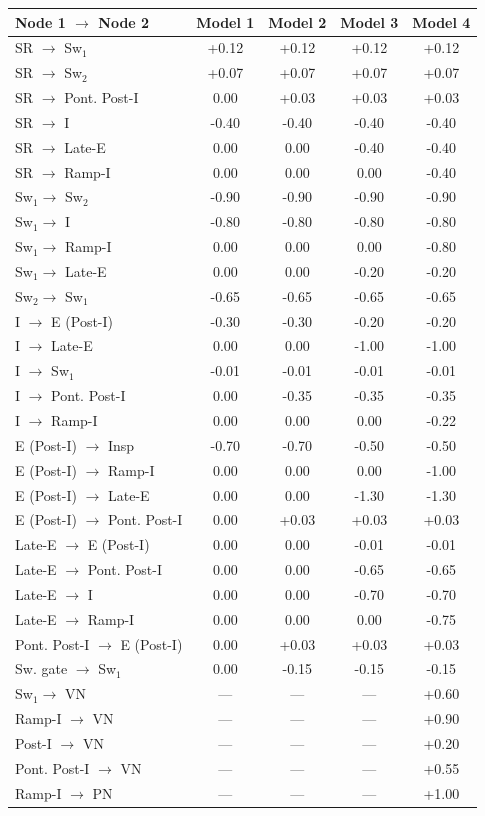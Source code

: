 \documentclass[pdflatex,sn-mathphys-ay]{sn-jnl}%
\theoremstyle{thmstyleone}%
\theoremstyle{thmstyletwo}%
\theoremstyle{thmstylethree}%
\begin{document}
\begin{center}
\begin{tabular}{l|c|c|c|c}
\hline
Node 1 $\to$ Node 2 & Model 1 & Model 2 & Model 3 & Model 4 \\ \hline
SR $\to$ Sw$_1$ & +0.12 & +0.12 & +0.12 & +0.12\\ 
SR $\to$ Sw$_2$ & +0.07 & +0.07 & +0.07 & +0.07\\ 
SR $\to$ Pont. Post-I & 0.00 & +0.03 & +0.03 & +0.03\\ 
SR $\to$ I & -0.40 & -0.40 & -0.40 & -0.40\\ 
SR $\to$ Late-E & 0.00 & 0.00 & -0.40 & -0.40\\ 
SR $\to$ Ramp-I & 0.00 & 0.00 & 0.00 & -0.40\\ 
Sw$_1 \to$ Sw$_2$ & -0.90 & -0.90 & -0.90 & -0.90\\ 
Sw$_1 \to$ I & -0.80 & -0.80 & -0.80 & -0.80\\
Sw$_1 \to$ Ramp-I & 0.00 & 0.00 & 0.00 & -0.80\\
Sw$_1 \to$ Late-E & 0.00 & 0.00 & -0.20 & -0.20\\
Sw$_2 \to$ Sw$_1$ & -0.65 & -0.65 & -0.65 & -0.65\\
I $\to$ E (Post-I) & -0.30 & -0.30 & -0.20 & -0.20\\
I $\to$ Late-E & 0.00 & 0.00 & -1.00 & -1.00\\
I $\to$ Sw$_1$ & -0.01 & -0.01 & -0.01 & -0.01\\
I $\to$ Pont. Post-I & 0.00 & -0.35 & -0.35 & -0.35\\
I $\to$ Ramp-I & 0.00 & 0.00 & 0.00 & -0.22\\
E (Post-I) $\to$ Insp & -0.70 & -0.70 & -0.50 & -0.50\\
E (Post-I) $\to$ Ramp-I & 0.00 & 0.00 & 0.00 & -1.00\\
E (Post-I) $\to$ Late-E & 0.00 & 0.00 & -1.30 & -1.30\\
E (Post-I) $\to$ Pont. Post-I & 0.00 & +0.03 & +0.03 & +0.03\\
Late-E $\to$ E (Post-I) & 0.00 & 0.00 & -0.01 & -0.01\\
Late-E $\to$ Pont. Post-I & 0.00 & 0.00 & -0.65 & -0.65\\
Late-E $\to$ I & 0.00 & 0.00 & -0.70 & -0.70\\
Late-E $\to$ Ramp-I & 0.00 & 0.00 & 0.00 & -0.75\\
Pont. Post-I $\to$ E (Post-I) & 0.00 & +0.03 & +0.03 & +0.03\\
Sw. gate $\to$ Sw$_1$ & 0.00 & -0.15 & -0.15 & -0.15\\
Sw$_1 \to$ VN & --- & --- & --- & +0.60\\
Ramp-I $\to$ VN & --- & --- & --- & +0.90\\
Post-I $\to$ VN & --- & --- & --- & +0.20\\
Pont. Post-I $\to$ VN & --- & --- & --- & +0.55\\
Ramp-I $\to$ PN & --- & --- & --- & +1.00\\ \hline
\end{tabular}
\label{tbl: connectivity_params}
\end{center}
\end{document}
